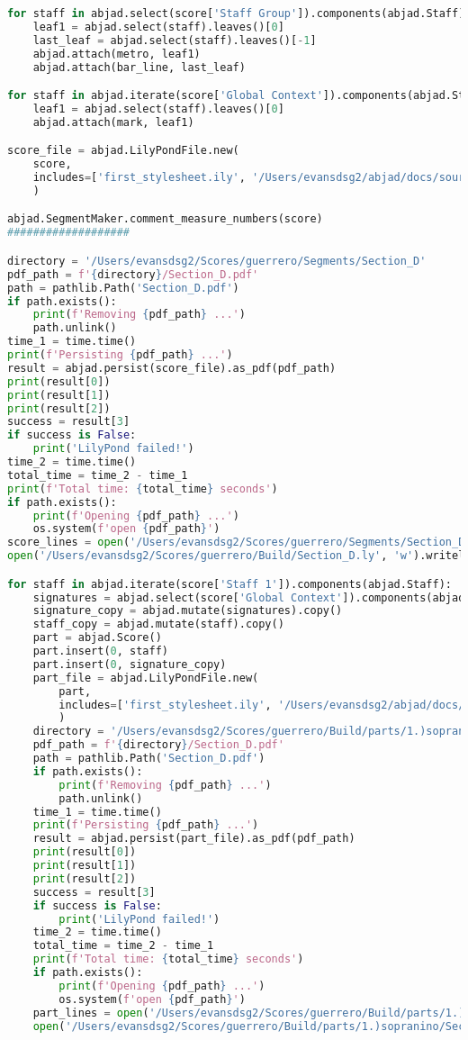 \begin{lstlisting}[language=Python, caption=Invocation Source Code]
for staff in abjad.select(score['Staff Group']).components(abjad.Staff):
    leaf1 = abjad.select(staff).leaves()[0]
    last_leaf = abjad.select(staff).leaves()[-1]
    abjad.attach(metro, leaf1)
    abjad.attach(bar_line, last_leaf)

for staff in abjad.iterate(score['Global Context']).components(abjad.Staff):
    leaf1 = abjad.select(staff).leaves()[0]
    abjad.attach(mark, leaf1)

score_file = abjad.LilyPondFile.new(
    score,
    includes=['first_stylesheet.ily', '/Users/evansdsg2/abjad/docs/source/_stylesheets/abjad.ily'],
    )

abjad.SegmentMaker.comment_measure_numbers(score)
###################

directory = '/Users/evansdsg2/Scores/guerrero/Segments/Section_D'
pdf_path = f'{directory}/Section_D.pdf'
path = pathlib.Path('Section_D.pdf')
if path.exists():
    print(f'Removing {pdf_path} ...')
    path.unlink()
time_1 = time.time()
print(f'Persisting {pdf_path} ...')
result = abjad.persist(score_file).as_pdf(pdf_path)
print(result[0])
print(result[1])
print(result[2])
success = result[3]
if success is False:
    print('LilyPond failed!')
time_2 = time.time()
total_time = time_2 - time_1
print(f'Total time: {total_time} seconds')
if path.exists():
    print(f'Opening {pdf_path} ...')
    os.system(f'open {pdf_path}')
score_lines = open('/Users/evansdsg2/Scores/guerrero/Segments/Section_D/Section_D.ly').readlines()
open('/Users/evansdsg2/Scores/guerrero/Build/Section_D.ly', 'w').writelines(score_lines[15:-1])

for staff in abjad.iterate(score['Staff 1']).components(abjad.Staff):
    signatures = abjad.select(score['Global Context']).components(abjad.Staff)
    signature_copy = abjad.mutate(signatures).copy()
    staff_copy = abjad.mutate(staff).copy()
    part = abjad.Score()
    part.insert(0, staff)
    part.insert(0, signature_copy)
    part_file = abjad.LilyPondFile.new(
        part,
        includes=['first_stylesheet.ily', '/Users/evansdsg2/abjad/docs/source/_stylesheets/abjad.ily'],
        )
    directory = '/Users/evansdsg2/Scores/guerrero/Build/parts/1.)sopranino'
    pdf_path = f'{directory}/Section_D.pdf'
    path = pathlib.Path('Section_D.pdf')
    if path.exists():
        print(f'Removing {pdf_path} ...')
        path.unlink()
    time_1 = time.time()
    print(f'Persisting {pdf_path} ...')
    result = abjad.persist(part_file).as_pdf(pdf_path)
    print(result[0])
    print(result[1])
    print(result[2])
    success = result[3]
    if success is False:
        print('LilyPond failed!')
    time_2 = time.time()
    total_time = time_2 - time_1
    print(f'Total time: {total_time} seconds')
    if path.exists():
        print(f'Opening {pdf_path} ...')
        os.system(f'open {pdf_path}')
    part_lines = open('/Users/evansdsg2/Scores/guerrero/Build/parts/1.)sopranino/Section_D.ly').readlines()
    open('/Users/evansdsg2/Scores/guerrero/Build/parts/1.)sopranino/Section_D.ly', 'w').writelines(part_lines[15:-1])


\end{lstlisting}
